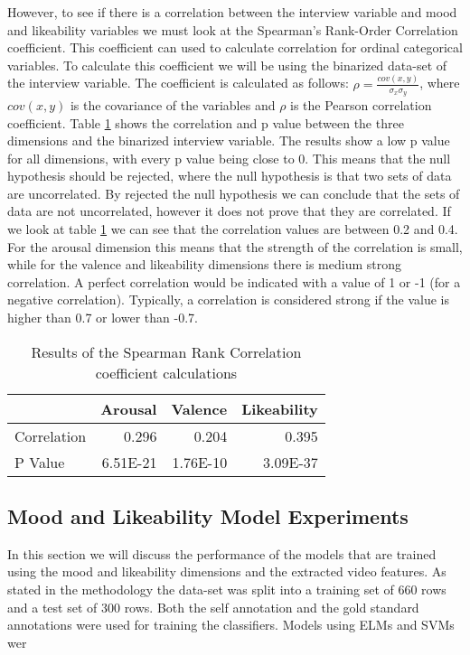 However, to see if there is a correlation between the interview variable and mood and likeability variables we must look at the Spearman's Rank-Order Correlation coefficient. This coefficient can used to calculate correlation for ordinal categorical variables. To calculate this coefficient we will be using the binarized data-set of the interview variable. The coefficient is calculated as follows: \(\rho = \frac{cov(x,y)}{\sigma_x \sigma_y}\), where \(cov(x,y)\) is the covariance of the variables and \(\rho\) is the Pearson correlation coefficient. Table \ref{tab:spearman} shows the correlation and p value between the three dimensions and the binarized interview variable. The results show a low p value for all dimensions, with every p value being close to 0. This means that the null hypothesis should be rejected, where the null hypothesis is that two sets of data are uncorrelated. By rejected the null hypothesis we can conclude that the sets of data are not uncorrelated, however it does not prove that they are correlated. If we look at table \ref{tab:spearman} we can see that the correlation values are between 0.2 and 0.4. For the arousal dimension this means that the strength of the correlation is small, while for the valence and likeability dimensions there is medium strong correlation. A perfect correlation would be indicated with a value of 1 or -1 (for a negative correlation). Typically, a correlation is considered strong if the value is higher than 0.7 or lower than -0.7. 

\begin{table}[h]
\begin{tabular}{|l|r|r|r|}
\hline
\rowcolor[HTML]{C0C0C0} 
 & \multicolumn{1}{l|}{\cellcolor[HTML]{C0C0C0}Arousal} & \multicolumn{1}{l|}{\cellcolor[HTML]{C0C0C0}Valence} & \multicolumn{1}{l|}{\cellcolor[HTML]{C0C0C0}Likeability} \\ \hline
Correlation & 0.296 & 0.204 & 0.395 \\ \hline
P Value & 6.51E-21 & 1.76E-10 & 3.09E-37 \\ \hline
\end{tabular}
\caption{Results of the Spearman Rank Correlation coefficient calculations}
\label{tab:spearman}
\end{table}

\subsection{Mood and Likeability Model Experiments}
In this section we will discuss the performance of the models that are trained using the mood and likeability dimensions and the extracted video features. As stated in the methodology the data-set was split into a training set of 660 rows and a test set of 300 rows. Both the self annotation and the gold standard annotations were used for training the classifiers. Models using ELMs and SVMs wer

